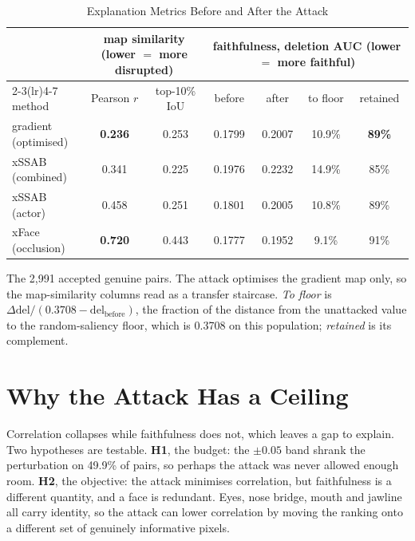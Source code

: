 \documentclass[conference,10pt]{IEEEtran}
\begin{document}
\begin{table}[!t]
  \centering
  \caption{Explanation Metrics Before and After the Attack}
  \label{tab:attack}
  \begin{tabular}{lcccccc}
    \toprule
    & \multicolumn{2}{c}{map similarity (lower $=$ more disrupted)}
    & \multicolumn{4}{c}{faithfulness, deletion AUC (lower $=$ more faithful)} \\
    \cmidrule(lr){2-3}\cmidrule(lr){4-7}
    method & Pearson $r$ & top-10\% IoU & before & after & to floor & retained \\
    \midrule
    gradient (optimised) & \textbf{0.236} & 0.253 & 0.1799 & 0.2007 & 10.9\% & \textbf{89\%} \\
    xSSAB (combined)     & 0.341 & 0.225 & 0.1976 & 0.2232 & 14.9\% & 85\% \\
    xSSAB (actor)        & 0.458 & 0.251 & 0.1801 & 0.2005 & 10.8\% & 89\% \\
    xFace (occlusion)    & \textbf{0.720} & 0.443 & 0.1777 & 0.1952 & \phantom{0}9.1\% & 91\% \\
    \bottomrule
  \end{tabular}
  \vspace{2pt}
  \parbox{0.92\textwidth}{\footnotesize The 2{,}991 accepted genuine pairs. The attack
  optimises the gradient map only, so the map-similarity columns read as a transfer staircase.
  \emph{To floor} is $\Delta\mathrm{del}/(0.3708 - \mathrm{del}_{\mathrm{before}})$, the
  fraction of the distance from the unattacked value to the random-saliency floor, which is
  0.3708 on this population; \emph{retained} is its complement.}
\end{table}

\section{Why the Attack Has a Ceiling}
\label{sec:ceiling}

Correlation collapses while faithfulness does not, which leaves a gap to explain. Two
hypotheses are testable. \textbf{H1}, the budget: the $\pm 0.05$ band shrank the perturbation
on 49.9\% of pairs, so perhaps the attack was never allowed enough room. \textbf{H2}, the
objective: the attack minimises correlation, but faithfulness is a different quantity, and a
face is redundant. Eyes, nose bridge, mouth and jawline all carry identity, so the attack can
lower correlation by moving the ranking onto a different set of genuinely informative pixels.
\end{document}
